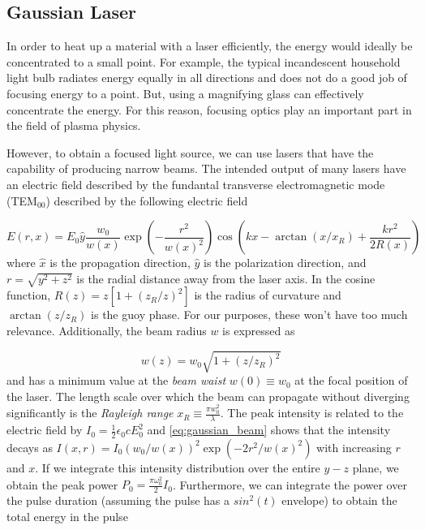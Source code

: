\subsection{Gaussian Laser}
In order to heat up a material with a laser efficiently, the energy would ideally be concentrated to a small point. For example, the typical incandescent household light bulb radiates energy equally in all directions and does not do a good job of focusing energy to a point. But, using a magnifying glass can effectively concentrate the energy. For this reason, focusing optics play an important part in the field of plasma physics. 

However, to obtain a focused light source, we can use lasers that have the capability of producing narrow beams. The intended output of many lasers have an electric field described by the fundantal transverse electromagnetic mode\cite{Zangwill_2012} (TEM$_{00}$) described by the following electric field

\begin{equation}
	E(r, x) = E_0 \hat{y} \frac{w_0}{w(x)} \exp( - \frac{r^2}{w(x)^2}) \cos(k x - \arctan(x/x_R) + \frac{k r^2}{2 R(x)}) \label{eq:gaussian_beam}
\end{equation}
where $\hat{x}$ is the propagation direction, $\hat{y}$ is the polarization direction, and $r = \sqrt{y^2 + z^2}$ is the radial distance away from the laser axis. In the cosine function, $R(z) = z [1 + (z_R/z)^2]$ is the radius of curvature and $\arctan(z/z_R)$ is the guoy phase. For our purposes, these won't have too much relevance. Additionally, the beam radius $w$ is expressed as

\begin{equation}
	w(z) = w_0 \sqrt{1 + (z/z_R)^2} \label{eq:beam_radius}
\end{equation}  
and has a minimum value at the \emph{beam waist} $w(0) \equiv w_0$ at the focal position of the laser. The length scale over which the beam can propagate without diverging significantly is the \emph{Rayleigh range} $x_R \equiv \frac{\pi w_0^2}{\lambda}$. The peak intensity is related to the electric field by $I_0 = \frac{1}{2} \epsilon_0 c E_0^2$ and \cref{eq:gaussian_beam} shows that the intensity decays as $I(x, r) = I_0 (w_0 / w(x))^2 \exp(-2 r^2 / w(x)^2)$ with increasing $r$ and $x$. If we integrate this intensity distribution over the entire $y-z$ plane, we obtain the peak power $P_0 = \frac{\pi \omega_0^2}{2} I_0$. Furthermore, we can integrate the power over the pulse duration (assuming the pulse has a $sin^2(t)$ envelope) to obtain the total energy in the pulse 

